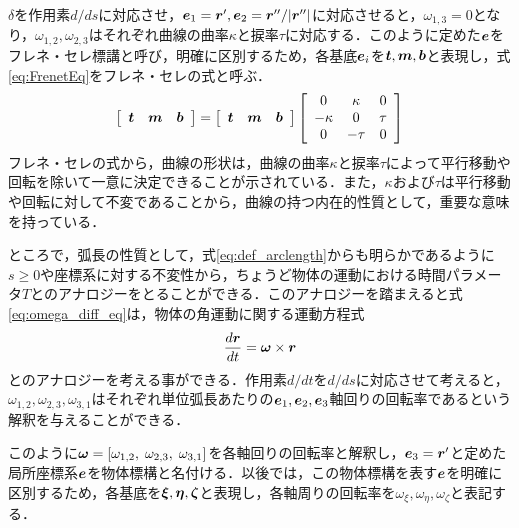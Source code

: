  	$ \delta $を作用素$ d/ds $に対応させ，$ \boldsymbol{e}_1 = \boldsymbol{r}', \boldsymbol{e}_2 = \boldsymbol{r}''/|\boldsymbol{r}''|$に対応させると，$ \omega_{1,3} = 0$となり，$ \omega_{1,2},\omega_{2,3} $はそれぞれ曲線の曲率$ \kappa $と捩率$ \tau $に対応する．このように定めた$ \boldsymbol{e} $をフレネ・セレ標講と呼び，明確に区別するため，各基底$ \boldsymbol{e}_i $を$ \boldsymbol{t},\boldsymbol{m},\boldsymbol{b} $と表現し，式\ref{eq:FrenetEq}をフレネ・セレの式と呼ぶ．
 	\begin{equation}\label{eq:FrenetEq}
 		\left[ \begin{array}{ccc}
 			\boldsymbol{t} & \boldsymbol{m} & \boldsymbol{b} 
 		\end{array}\right] = \left[ \begin{array}{ccc}
 		\boldsymbol{t} & \boldsymbol{m} & \boldsymbol{b} 
 	\end{array}\right] \left[
 	\begin{array}{ccc}
 		0 & \kappa & 0 \\
 		-\kappa & 0 & \tau \\
 		0 & -\tau & 0 
 	\end{array}
 \right]
 	\end{equation}
 	フレネ・セレの式から，曲線の形状は，曲線の曲率$ \kappa $と捩率$ \tau $によって平行移動や回転を除いて一意に決定できることが示されている．また，$ \kappa $および$ \tau $は平行移動や回転に対して不変であることから，曲線の持つ内在的性質として，重要な意味を持っている．
 	
 	ところで，弧長の性質として，式\ref{eq:def_arclength}からも明らかであるように$ s \geq 0 $や座標系に対する不変性から，ちょうど物体の運動における時間パラメータ$ T $とのアナロジーをとることができる．このアナロジーを踏まえると式\ref{eq:omega_diff_eq}は，物体の角運動に関する運動方程式
 	\begin{equation}\label{eq:RotateEq}
 		\frac{d\boldsymbol{r}}{dt} =  \boldsymbol{\omega} \times \boldsymbol{r} 
 	\end{equation}
 	とのアナロジーを考える事ができる．作用素$ d/dt $を$ d/ds $に対応させて考えると，$ \omega_{1,2}, \omega_{2,3},\omega_{3,1} $はそれぞれ単位弧長あたりの$ \boldsymbol{e}_1,\boldsymbol{e}_2,\boldsymbol{e}_3 $軸回りの回転率であるという解釈を与えることができる．
 	
 	このように$ \boldsymbol{\omega} = [\omega_{1,2},\; \omega_{2,3},\; \omega_{3,1}] $を各軸回りの回転率と解釈し，$ \boldsymbol{e}_3 = \boldsymbol{r}'$と定めた局所座標系$ \boldsymbol{e}$を物体標構と名付ける．以後では，この物体標構を表す$ \boldsymbol{e} $を明確に区別するため，各基底を$ \boldsymbol{\xi},\boldsymbol{\eta},\boldsymbol{\zeta} $と表現し，各軸周りの回転率を$ \omega_{\xi},\omega_{\eta},\omega_{\zeta} $と表記する．
 	
 	
